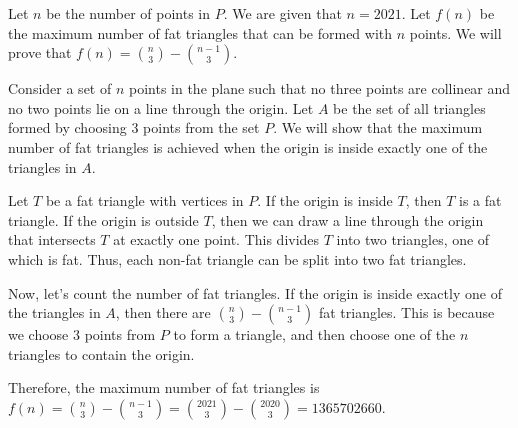 Let \( n \) be the number of points in \( P \). We are given that \( n = 2021 \). Let \( f(n) \) be the maximum number of fat triangles that can be formed with \( n \) points. We will prove that \( f(n) = \binom{n}{3} - \binom{n-1}{3} \).

Consider a set of \( n \) points in the plane such that no three points are collinear and no two points lie on a line through the origin. Let \( A \) be the set of all triangles formed by choosing \( 3 \) points from the set \( P \). We will show that the maximum number of fat triangles is achieved when the origin is inside exactly one of the triangles in \( A \).

Let \( T \) be a fat triangle with vertices in \( P \). If the origin is inside \( T \), then \( T \) is a fat triangle. If the origin is outside \( T \), then we can draw a line through the origin that intersects \( T \) at exactly one point. This divides \( T \) into two triangles, one of which is fat. Thus, each non-fat triangle can be split into two fat triangles.

Now, let's count the number of fat triangles. If the origin is inside exactly one of the triangles in \( A \), then there are \( \binom{n}{3} - \binom{n-1}{3} \) fat triangles. This is because we choose \( 3 \) points from \( P \) to form a triangle, and then choose one of the \( n \) triangles to contain the origin.

Therefore, the maximum number of fat triangles is \( f(n) = \binom{n}{3} - \binom{n-1}{3} = \binom{2021}{3} - \binom{2020}{3} = 1365702660 \).
